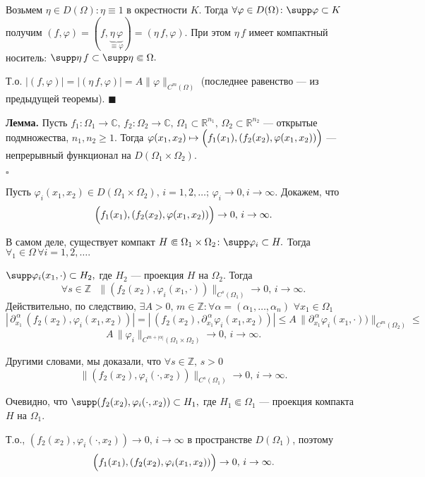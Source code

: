 \documentclass[unicode,12pt,draft]{article}
\begin{document}
Возьмем $\eta\in D(\Omega)\colon \eta\equiv1$ в окрестности $K$.
Тогда $\forall \varphi\in D(\Omega)\colon \supp \varphi\subset K$
получим
$(f,\varphi)=(f,\underbrace{\eta\,\varphi}_{\equiv\varphi})=(\eta\,f,\varphi).$
При этом $\eta\,f$ имеет компактный носитель: $\supp
\eta\,f\subset \supp \eta\Subset\Omega.$

Т.о.
$|(f,\varphi)|=|(\eta\,f,\varphi)|=A\|\varphi\|_{C^m(\Omega)}$
(последнее равенство --- из предыдущей теоремы). $\blacksquare$

\textbf{Лемма.} Пусть $f_1\colon \Omega_1\to \mathbb C,\,f_2\colon
\Omega_2\to \mathbb C,\,\Omega_1\subset\mathbb
R^{n_1},\,\Omega_2\subset\mathbb R^{n_2}$ --- открытые
подмножества, $n_1,n_2\ge1.$ Тогда $\varphi(x_1,x_2)\mapsto
\Bigl(f_1(x_1),(f_2(x_2),\varphi(x_1,x_2))\Bigr)$ --- непрерывный
функционал на $D(\Omega_1\times\Omega_2).$

$\square$

Пусть $\varphi_i(x_1,x_2)\in
D(\Omega_1\times\Omega_2),\,i=1,2,\ldots;\, \varphi_i\to0,
i\to{\infty}.$ Докажем, что
$$\Bigl(f_1(x_1),(f_2(x_2),\varphi(x_1,x_2))\Bigr)\to0,\,i\to{\infty}.$$

В самом деле, существует компакт
$H\Subset\Omega_1\times\Omega_2\colon \supp \varphi_i\subset H.$
Тогда $\forall _1\in\Omega\,\forall i=1,2,\ldots.$

$\supp \varphi_i(x_1,\cdot)\subset H_2,$ где $H_2$ --- проекция
$H$ на $\Omega_2.$ Тогда
$$\forall s\in \mathbb Z\,\,\,\,
\|(f_2(x_2),\varphi_i(x_1,\cdot))\|_{C^s(\Omega_1)}\to0,\,i\to{\infty}.$$
Действительно, по следствию, $\exists A>0,\,m\in \mathbb Z\colon
\forall \alpha=(\alpha_1,\ldots,\alpha_n) \,\,\forall
x_1\in\Omega_1$
$$|\,\partial^{\,\alpha}_{x_1}\,(f_2(x_2),\varphi_i(x_1,x_2))|=
|\,(f_2(x_2),\partial^{\,\alpha}_{x_1}\varphi_i(x_1,x_2))|\le
A\,\|\partial^{\,\alpha}_{x_1}\varphi_i(x_1,\cdot))\|_{C^m(\Omega_2)}\le$$
$$A\,\|\varphi_i\|_{C^{m+|\alpha|}(\Omega_1\times\Omega_2)}\to0,\,i\to{\infty}.$$

Другими словами, мы доказали, что $\forall s\in \mathbb Z,\,s>0$
$$\|(f_2(x_2),\varphi_i(\cdot,x_2))\|_{C^s(\Omega_1)}\to0,\,i\to{\infty}.$$

Очевидно, что $\supp (f_2(x_2),\varphi_i(\cdot,x_2))\subset H_1,$
где $H_1\Subset\Omega_1$ --- проекция компакта $H$ на $\Omega_1.$

Т.о., $(f_2(x_2),\varphi_i(\cdot,x_2))\to0,\,i\to{\infty}$ в
пространстве $D(\Omega_1)$, поэтому
$$\Bigl(f_1(x_1),(f_2(x_2),\varphi_i(x_1,x_2))\Bigr)\to0,\,i\to{\infty}.$$
\end{document}
